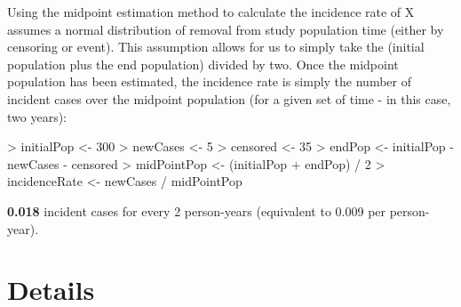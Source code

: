 \documentclass[12pt]{article}
\begin{document}
Using the midpoint estimation method to calculate the incidence rate of X assumes a normal distribution of removal from study population time (either by censoring or event).  This assumption allows for us to simply take the (initial population plus the end population) divided by two.  Once the midpoint population has been estimated, the incidence rate is simply the number of incident cases over the midpoint population (for a given set of time - in this case, two years):

\begin{Schunk}
\begin{Sinput}
> initialPop <- 300
> newCases <- 5
> censored <- 35
> endPop <- initialPop - newCases - censored
> midPointPop <- (initialPop + endPop) / 2 
> incidenceRate <- newCases / midPointPop
\end{Sinput}
\end{Schunk}

\textbf{0.018} incident cases for every 2 person-years (equivalent to 0.009 per person-year).

\newpage
\section*{Details}
\end{document}
